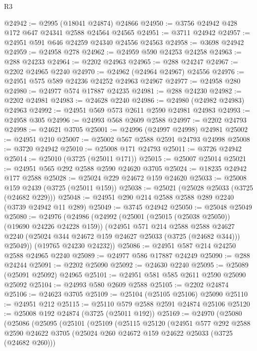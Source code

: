 \begin{lexlean}{R3}
\begin{coremodule}
@24942 := @2995 (@18041 @24874) @24866
@24950 := @3756 @24942 @428 @172 @647 @24341 @2588 @24564 @24565
@24951 := @3711 @24942
@24957 := @24951 @591 @646 @24259 @24340 @24556 @24563
@24958 := @3698 @24942
@24959 := @24958 @278
@24962 := @24959 @590 @24253 @24258
@24963 := @288 @24233
@24964 := @2202 @24963
@24965 := @288 @24247
@24967 := @2202 @24965 @2240
@24970 := @24962 (@24964 @24967) @24556
@24976 := @24951 @575 @589 @24236 @24252 @24963 @24967
@24977 := @24958 @280
@24980 := @24977 @574 @17887 @24235
@24981 := @288 @24230
@24982 := @2202 @24981
@24983 := @24628 @2240
@24986 := @24980 (@24982 @24983) @24963
@24992 := @24951 @569 @573 @2611 @2590 @24981 @24983
@24993 := @24958 @305
@24996 := @24993 @568 @2609 @2588
@24997 := @2202 @24793
@24998 := @24621 @3705
@25001 := @24996 (@24997 @24998) @24981
@25002 := @24951 @210
@25007 := @25002 @567 @2588 @2591 @24793 @24998
@25008 := @3720 @24942
@25010 := @25008 @171 @24793
@25011 := @3726 @24942
@25014 := @25010 (@3725 (@25011 @171))
@25015 := @25007 @25014
@25021 := @24951 @565 @292 @2588 @2590 @24620 @3705
@25024 := @18235 @24942 @177 @2588
@25028 := @25024 @229 @24672 @159 @24620
@25033 := @25008 @159 @2439 (@3725 (@25011 @159))
@25038 := @25021 (@25028 @25033 (@3725 (@24682 @229)))
@25048 := @24951 @290 @214 @2588 @2588 @289 @2240 (@3739 @24942 @11 @289)
@25049 := @3745 @24942
@25050 := @25048 @25049
@25080 := @24976
    (@24986
      (@24992
        (@25001 (@25015 (@25038 @25050)) (@19690 @24226 @24228 @159))
        (@24951
          @571
          @214
          @2588
          @2588
          @24627
          @2240
          (@25024 @344 @24672 @159 @24627 @25033 (@3725 (@24682 @344)))
          @25049))
      (@19765 @24230 @24232))
@25086 := @24951 @587 @214 @24250 @2588 @24965 @2240
@25089 := @24977 @586 @17887 @24249
@25090 := @288 @24244
@25091 := @2202 @25090
@25092 := @24630 @2240
@25095 := @25089 (@25091 @25092) @24965
@25101 := @24951 @581 @585 @2611 @2590 @25090 @25092
@25104 := @24993 @580 @2609 @2588
@25105 := @2202 @24874
@25106 := @24623 @3705
@25109 := @25104 (@25105 @25106) @25090
@25110 := @24951 @212
@25115 := @25110 @579 @2588 @2591 @24874 @25106
@25120 := @25008 @192 @24874 (@3725 (@25011 @192))
@25169 := @24970
    (@25080
      (@25086
        (@25095
          (@25101
            (@25109
              (@25115
                @25120
                (@24951
                  @577
                  @292
                  @2588
                  @2590
                  @24622
                  @3705
                  (@25024 @260 @24672 @159 @24622 @25033 (@3725 (@24682 @260)))

\end{coremodule}
\end{lexlean}
